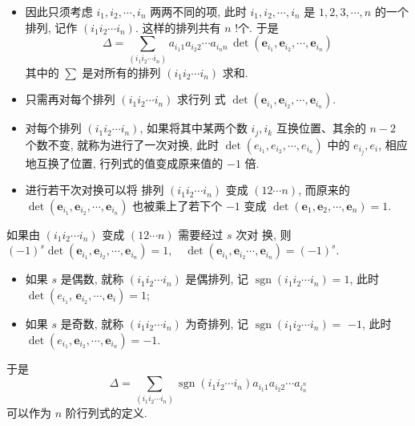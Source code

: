 \documentclass[10pt,punct]{ctexbeamer}
\begin{document}
\begin{frame}
\begin{itemize}
\item   因此只须考虑 $i_1, i_2, \cdots, i_n$ 两两不同的项, 此时 $i_1, i_2, \cdots, i_n$ 是 $1,2,3, \cdots, n$ 的一个排列, 记作 $\left(i_1 i_2 \cdots i_n\right)$. 这样的排列共有 $n$ !个. 于是
$$
\Delta=\sum_{\left(i_1 i_2 \cdots i_n\right)} a_{i_1 1} a_{i_2  2} \cdots a_{i_n n} \, \operatorname{det}\left(\boldsymbol{e}_{i_1}, \boldsymbol{e}_{i_2}, \cdots, \boldsymbol{e}_{i_n}\right)
$$
其中的 $\sum$ 是对所有的排列 $\left(i_1 i_2 \cdots i_n\right)$ 求和.
\item   只需再对每个排列 $\left(i_1 i_2 \cdots i_n\right)$ 求行列 式 $\operatorname{det}\left(\boldsymbol{e}_{i_1}, \boldsymbol{e}_{i_2}, \cdots, \boldsymbol{e}_{i_n}\right)$.

 \pause
\item
对每个排列 $\left(i_1 i_2 \cdots i_n\right)$, 如果将其中某两个数 $i_j, i_k$ 互换位置、其余的 $n-2$ 个数不变, 就称为进行了一次\alert{对换}, 此时 $\operatorname{det}\left(e_{i_1}, e_{i_2}, \cdots, e_{i_n}\right)$ 中的 $e_{i_j}, e_i$, 相应地互换了位置, 行列式的值变成原来值的 $-1$ 倍.

\item
进行若干次对换可以将
排列 $\left(i_1 i_2 \cdots i_n\right)$ 变成 $(12 \cdots n)$, 而原来的 $\operatorname{det}\left(\boldsymbol{e}_{i_1}, \boldsymbol{e}_{i_2}, \cdots, \boldsymbol{e}_{i_n}\right)$ 也被乘上了若下个 $-1$ 变成 $\operatorname{det}\left(\boldsymbol{e}_1, \boldsymbol{e}_2, \cdots, \boldsymbol{e}_n\right)=1$.

\end{itemize}
\end{frame}

\begin{frame}


    如果由 $\left(i_1 i_2 \cdots i_n\right)$ 变成 $(12 \cdots n)$ 需要经过 $s$ 次{对 换}, 则
    $
    (-1)^s \operatorname{det}\left(\boldsymbol{e}_{i_1}, \boldsymbol{e}_{i_2}, \cdots, \boldsymbol{e}_{i_n}\right)=1, \quad \operatorname{det}\left(\boldsymbol{e}_{i_1}, \boldsymbol{e}_{i_2} \cdots, \boldsymbol{e}_{i_n}\right)=(-1)^s.
    $
    \begin{itemize}
        \item 如果 $s$ 是偶数, 就称 $\left(i_1 i_2 \cdots i_n\right)$ 是偶排列, 记 $\operatorname{sgn} \left(i_1 i_2 \cdots i_n\right)=1$, 此时 $\operatorname{det}\left(e_{i_1}\right.$, $\left.\boldsymbol{e}_{i_2}, \cdots, \boldsymbol{e}_i\right)=1$;
        \item 如果 $s$ 是奇数, 就称 $\left(i_1 i_2 \cdots i_n\right)$ 为奇排列, 记 $\operatorname{sgn}\left(i_1 i_2 \cdots i_n\right)=$ $-1$, 此时 $\operatorname{det}\left(e_{i_1}, \boldsymbol{e}_{i_2}, \cdots, \boldsymbol{e}_{i_n}\right)=-1$.
    \end{itemize}

    于是 $$\Delta=\sum_{ \left(i_1 i_2 \cdots i_n\right)}  \operatorname{sgn}  \left(i_1 i_2 \cdots i_n\right) a_{i_1 1} a_{i_2 2} \cdots a_{i_n^n}$$ 可以作为 $n$ 阶行列式的定义.
\end{frame}
\end{document}
